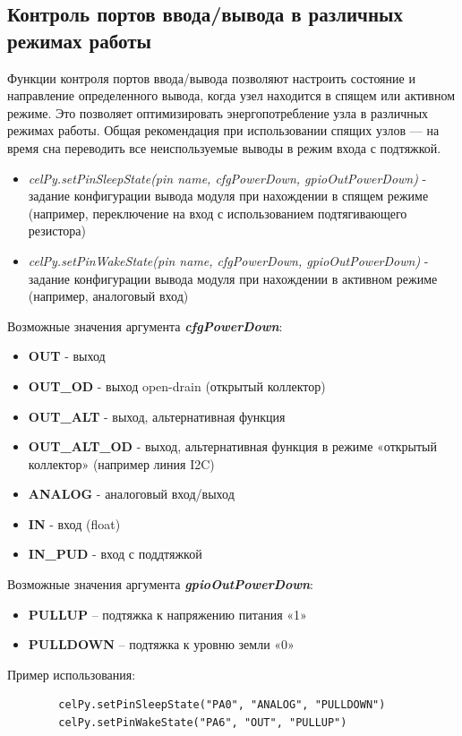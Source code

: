 \documentclass[12pt]{article}
\begin{document}
\subsection{Контроль портов ввода/вывода в различных режимах работы}
Функции контроля портов ввода/вывода позволяют настроить состояние и направление
определенного вывода, когда узел находится в спящем или активном режиме.
Это позволяет оптимизировать энергопотребление узла в различных режимах работы.
Общая рекомендация при использовании спящих узлов --- на время сна переводить все
неиспользуемые выводы в режим входа с подтяжкой.
    \begin{itemize}
    \item \emph{celPy.setPinSleepState(pin name, cfgPowerDown, gpioOutPowerDown)}
    - задание конфигурации вывода модуля при нахождении в спящем режиме (например, 
    переключение на вход с использованием подтягивающего резистора)
    \item \emph{celPy.setPinWakeState(pin name, cfgPowerDown, gpioOutPowerDown)}
    - задание конфигурации вывода модуля при нахождении в активном режиме (например,
    аналоговый вход)
    \end{itemize}

Возможные значения аргумента \textit{\textbf{cfgPowerDown}}:
    \begin{itemize}
    \item \textbf{OUT} - выход
    \item \textbf{OUT_OD} - выход open-drain (открытый коллектор)
    \item \textbf{OUT_ALT} - выход, альтернативная функция 
    \item \textbf{OUT_ALT_OD} - выход, альтернативная функция в режиме «открытый коллектор» (например линия I2C)
    \item \textbf{ANALOG} - аналоговый вход/выход
    \item \textbf{IN} - вход (float)
    \item \textbf{IN_PUD} - вход с поддтяжкой
    \end{itemize}
    
Возможные значения аргумента \textit{\textbf{gpioOutPowerDown}}:
    \begin{itemize}
    \item \textbf{PULLUP} -- подтяжка к напряжению питания «1»
    \item \textbf{PULLDOWN} -- подтяжка к уровню земли «0»
    \end{itemize}

Пример использования:
    \begin{verbatim}
        celPy.setPinSleepState("PA0", "ANALOG", "PULLDOWN")
        celPy.setPinWakeState("PA6", "OUT", "PULLUP")
    \end{verbatim}
    
\end{document}
